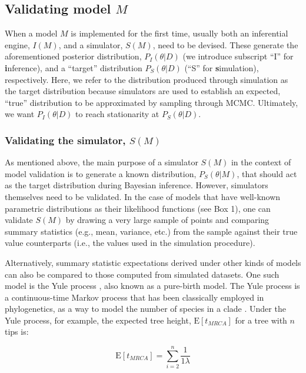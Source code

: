 \documentclass[oneside]{article}
\begin{document}
\subsection*{Validating model $M$}

When a model $M$ is implemented for the first time, usually both an
inferential engine, $I(M)$, and a simulator, $S(M)$, need to be devised.
These generate the aforementioned posterior distribution,
$P_I(\theta|D)$ (we introduce subscript ``I'' for
\textbf{i}nference), and a ``target'' distribution $P_S(\theta|D)$ (``S''
for \textbf{s}imulation), respectively.
Here, we refer to the distribution produced through simulation as the
target distribution because simulators are used to establish an
expected, ``true'' distribution to be approximated by sampling through MCMC.
Ultimately, we want $P_I(\theta|D)$ to reach stationarity at
$P_S(\theta|D)$.

\subsubsection*{Validating the simulator, $S(M)$}\label{verify-correctness-of-simulator-implementation}

As mentioned above, the main purpose of a simulator $S(M)$ in the context of model
validation is to generate a known distribution,
$P_S(\theta|M)$, that should act as the target distribution during
Bayesian inference.
However, simulators themselves need to be validated.
In the case of models that have well-known parametric distributions as their
likelihood functions (see Box 1), one can validate $S(M)$ by
drawing a very large sample of points and comparing summary statistics
(e.g., mean, variance, etc.) from the sample against their true value counterparts (i.e., the
values used in the simulation procedure). 

Alternatively, summary statistic expectations derived under other kinds of models can also be compared
to those computed from simulated datasets.
One such model is the Yule process \citep{yule24}, also known as a pure-birth model.
The Yule process is a continuous-time Markov process that has been
classically employed in phylogenetics, as a way to model the number of
species in a clade \citep{yule24,aldous01}.
Under the Yule process, for example, the expected tree height,
$\text{E}[t_{MRCA}]$ for a tree with $n$ tips is:

\begin{equation}
  \text{E}[t_{MRCA}] = \sum_{i=2}^{n}\frac{1}{1\lambda}
  \label{eq:yule}
\end{equation}
\end{document}
